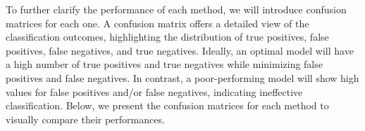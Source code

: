 \documentclass{article}
\begin{document}
To further clarify the performance of each method, we will introduce confusion matrices for each one. A confusion matrix offers a detailed view of the classification outcomes, highlighting the distribution of true positives, false positives, false negatives, and true negatives. Ideally, an optimal model will have a high number of true positives and true negatives while minimizing false positives and false negatives. In contrast, a poor-performing model will show high values for false positives and/or false negatives, indicating ineffective classification. Below, we present the confusion matrices for each method to visually compare their performances.

\begin{figure}[H]
	\centering
	\hspace{1em}
	\\
	\hspace{1em}

\end{figure}
\end{document}
